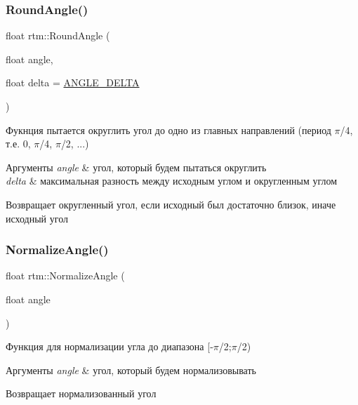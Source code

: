 \subsubsection{\texorpdfstring{Round\+Angle()}{RoundAngle()}}
{\footnotesize\ttfamily float rtm\+::\+Round\+Angle (\begin{DoxyParamCaption}\item[{float}]{angle,  }\item[{float}]{delta = {\ttfamily \hyperlink{namespacertm_ac78c5105838adb58682cb69a4c66efd7}{A\+N\+G\+L\+E\+\_\+\+D\+E\+L\+TA}} }\end{DoxyParamCaption})}



Фукнция пытается округлить угол до одно из главных направлений (период {$\pi$}/4, т.\+е. 0, {$\pi$}/4, {$\pi$}/2, ...) 


\begin{DoxyParams}{Аргументы}
{\em angle} & угол, который будем пытаться округлить \\
\hline
{\em delta} & максимальная разность между исходным углом и округленным углом \\
\hline
\end{DoxyParams}
\begin{DoxyReturn}{Возвращает}
округленный угол, если исходный был достаточно близок, иначе исходный угол 
\end{DoxyReturn}
\mbox{\label{namespacertm_a72a57dbe581a6743525e1920296d42fe}} 
\subsubsection{\texorpdfstring{Normalize\+Angle()}{NormalizeAngle()}}
{\footnotesize\ttfamily float rtm\+::\+Normalize\+Angle (\begin{DoxyParamCaption}\item[{float}]{angle }\end{DoxyParamCaption})}



Функция для нормализации угла до диапазона \mbox{[}-\/{$\pi$}/2;{$\pi$}/2) 


\begin{DoxyParams}{Аргументы}
{\em angle} & угол, который будем нормализовывать \\
\hline
\end{DoxyParams}
\begin{DoxyReturn}{Возвращает}
нормализованный угол 
\end{DoxyReturn}
\mbox{\label{namespacertm_a390df6b8bc4a01befd946155150db744}} 
